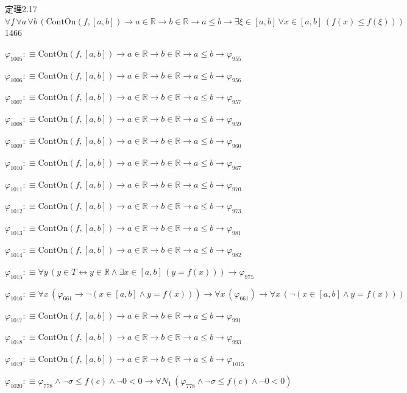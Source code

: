 \begin{fullproof}{定理2.17}{$\forall f\,\forall a\,\forall b\,(\mathrm{ContOn}(f,[a,b]) \to a \in \mathbb{R} \to b \in \mathbb{R} \to a \leq b \to \exists \xi \in [a,b]\,\forall x \in [a,b]\,(f(x) \leq f(\xi)))$}{1466}
\begin{abbrevlist}
\item $\varphi_{1005} :\equiv \mathrm{ContOn}(f,[a,b]) \to a \in \mathbb{R} \to b \in \mathbb{R} \to a \leq b \to \varphi_{955}$
\item $\varphi_{1006} :\equiv \mathrm{ContOn}(f,[a,b]) \to a \in \mathbb{R} \to b \in \mathbb{R} \to a \leq b \to \varphi_{956}$
\item $\varphi_{1007} :\equiv \mathrm{ContOn}(f,[a,b]) \to a \in \mathbb{R} \to b \in \mathbb{R} \to a \leq b \to \varphi_{957}$
\item $\varphi_{1008} :\equiv \mathrm{ContOn}(f,[a,b]) \to a \in \mathbb{R} \to b \in \mathbb{R} \to a \leq b \to \varphi_{959}$
\item $\varphi_{1009} :\equiv \mathrm{ContOn}(f,[a,b]) \to a \in \mathbb{R} \to b \in \mathbb{R} \to a \leq b \to \varphi_{960}$
\item $\varphi_{1010} :\equiv \mathrm{ContOn}(f,[a,b]) \to a \in \mathbb{R} \to b \in \mathbb{R} \to a \leq b \to \varphi_{967}$
\item $\varphi_{1011} :\equiv \mathrm{ContOn}(f,[a,b]) \to a \in \mathbb{R} \to b \in \mathbb{R} \to a \leq b \to \varphi_{970}$
\item $\varphi_{1012} :\equiv \mathrm{ContOn}(f,[a,b]) \to a \in \mathbb{R} \to b \in \mathbb{R} \to a \leq b \to \varphi_{973}$
\item $\varphi_{1013} :\equiv \mathrm{ContOn}(f,[a,b]) \to a \in \mathbb{R} \to b \in \mathbb{R} \to a \leq b \to \varphi_{981}$
\item $\varphi_{1014} :\equiv \mathrm{ContOn}(f,[a,b]) \to a \in \mathbb{R} \to b \in \mathbb{R} \to a \leq b \to \varphi_{982}$
\item $\varphi_{1015} :\equiv \forall y\,(y \in T \leftrightarrow y \in \mathbb{R} \land \exists x \in [a,b]\,(y = f(x))) \to \varphi_{975}$
\item $\varphi_{1016} :\equiv \forall x\,(\varphi_{661} \to \neg (x \in [a,b] \land y = f(x))) \to \forall x\,(\varphi_{661}) \to \forall x\,(\neg (x \in [a,b] \land y = f(x)))$
\item $\varphi_{1017} :\equiv \mathrm{ContOn}(f,[a,b]) \to a \in \mathbb{R} \to b \in \mathbb{R} \to a \leq b \to \varphi_{991}$
\item $\varphi_{1018} :\equiv \mathrm{ContOn}(f,[a,b]) \to a \in \mathbb{R} \to b \in \mathbb{R} \to a \leq b \to \varphi_{993}$
\item $\varphi_{1019} :\equiv \mathrm{ContOn}(f,[a,b]) \to a \in \mathbb{R} \to b \in \mathbb{R} \to a \leq b \to \varphi_{1015}$
\item $\varphi_{1020} :\equiv \varphi_{778} \land \neg \sigma \leq f(c) \land \neg 0 < 0 \to \forall N_{1}\,(\varphi_{778} \land \neg \sigma \leq f(c) \land \neg 0 < 0)$

\end{abbrevlist}
\end{fullproof}
